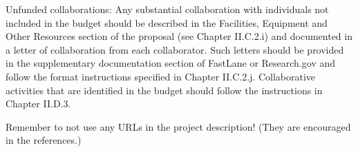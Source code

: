 %


Unfunded collaborations: Any substantial collaboration with individuals not included in the budget should be described in the Facilities, Equipment and Other Resources section of the proposal (see Chapter II.C.2.i) and documented in a letter of collaboration from each collaborator. Such letters should be provided in the supplementary documentation section of FastLane or Research.gov and follow the format instructions specified in Chapter II.C.2.j. Collaborative activities that are identified in the budget should follow the instructions in Chapter II.D.3.

Remember to not use any URLs in the project description!  (They are
encouraged in the references.)

